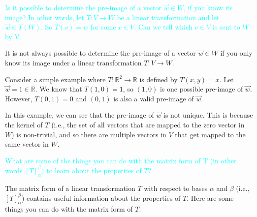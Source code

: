 \documentclass[fontsize=12pt]{scrartcl}
\begin{document}
\noindent
\textcolor{cyan}{Is it possible to determine the pre-image of a vector $\vec{w} \in W$, if you know its image? In other words, let $T: V \to W$ be a linear transformation and let $\vec{w} \in T(W)$. So $T(v) = w$ for some $v \in V$. Can we tell which $v \in V$ is sent to $W$ by V.\\}

\noindent
It is not always possible to determine the pre-image of a vector $\vec{w} \in W$ if you only know its image under a linear transformation $T: V \rightarrow W$.

\noindent
Consider a simple example where $T: \mathbb{R}^2 \rightarrow \mathbb{R}$ is defined by $T(x,y) = x$. Let $\vec{w} = 1 \in \mathbb{R}$. We know that $T(1,0) = 1$, so $(1,0)$ is one possible pre-image of $\vec{w}$. However, $T(0,1) = 0$ and $(0,1)$ is also a valid pre-image of $\vec{w}$.

\noindent
In this example, we can see that the pre-image of $\vec{w}$ is not unique. This is because the kernel of $T$ (i.e., the set of all vectors that are mapped to the zero vector in $W$) is non-trivial, and so there are multiple vectors in $V$ that get mapped to the same vector in $W$.

\noindent
\textcolor{cyan}{What are some of the things you can do with the matrix form of T (in other words $[T]_{\alpha}^{\beta})$ to learn about the properties of $T$?}

The matrix form of a linear transformation $T$ with respect to bases $\alpha$ and $\beta$ (i.e., $[T]_{\alpha}^{\beta}$) contains useful information about the properties of $T$. Here are some things you can do with the matrix form of $T$:
\end{document}
